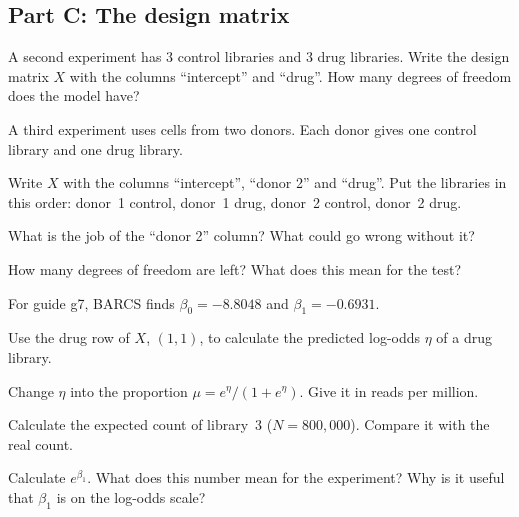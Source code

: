 \subsection*{Part C: The design matrix}
\begin{exlist}[resume*=ex1]
\item \tagwrite{} A second experiment has 3 control libraries and 3 drug
libraries. Write the design matrix $X$ with the columns ``intercept'' and
``drug''. How many degrees of freedom does the model have?

\item \tagwrite{} \tagexplain{} A third experiment uses cells from two
donors. Each donor gives one control library and one drug library.
\begin{parts}
\item Write $X$ with the columns ``intercept'', ``donor 2'' and ``drug''.
  Put the libraries in this order: donor~1 control, donor~1 drug, donor~2
  control, donor~2 drug.
\item What is the job of the ``donor 2'' column? What could go wrong
  without it?
\item How many degrees of freedom are left? What does this mean for the
  test?
\end{parts}

\item \tagcalc{} For guide g7, BARCS finds $\beta_0 = -8.8048$ and
$\beta_1 = -0.6931$.
\begin{parts}
\item Use the drug row of $X$, $(1, 1)$, to calculate the predicted
  log-odds $\eta$ of a drug library.
\item Change $\eta$ into the proportion $\mu = e^{\eta} / (1 + e^{\eta})$.
  Give it in reads per million.
\item Calculate the expected count of library~3 ($N = 800{,}000$). Compare
  it with the real count.
\end{parts}

\item \tagexplain{} Calculate $e^{\beta_1}$. What does this number mean for
the experiment? Why is it useful that $\beta_1$ is on the log-odds scale?
\end{exlist}
